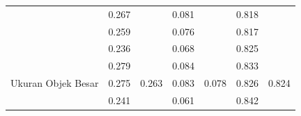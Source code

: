\begin{table}[]
\begin{tabular}{|l|cc|cc|cc|}
                                                      & \multicolumn{1}{c|}{\cellcolor[HTML]{FFFFFF}0.267} & \cellcolor[HTML]{FFFFFF}                         & \multicolumn{1}{c|}{\cellcolor[HTML]{FFFFFF}0.081} & \cellcolor[HTML]{FFFFFF}                           & \multicolumn{1}{c|}{\cellcolor[HTML]{FFFFFF}0.818} & \cellcolor[HTML]{FFFFFF}                        \\ \cline{2-2} \cline{4-4} \cline{6-6}
                                                      & \multicolumn{1}{c|}{\cellcolor[HTML]{FFFFFF}0.259} & \cellcolor[HTML]{FFFFFF}                         & \multicolumn{1}{c|}{\cellcolor[HTML]{FFFFFF}0.076} & \cellcolor[HTML]{FFFFFF}                           & \multicolumn{1}{c|}{\cellcolor[HTML]{FFFFFF}0.817} & \cellcolor[HTML]{FFFFFF}                        \\ \cline{2-2} \cline{4-4} \cline{6-6}
                                                      & \multicolumn{1}{c|}{\cellcolor[HTML]{FFFFFF}0.236} & \cellcolor[HTML]{FFFFFF}                         & \multicolumn{1}{c|}{\cellcolor[HTML]{FFFFFF}0.068} & \cellcolor[HTML]{FFFFFF}                           & \multicolumn{1}{c|}{\cellcolor[HTML]{FFFFFF}0.825} & \cellcolor[HTML]{FFFFFF}                        \\ \cline{2-2} \cline{4-4} \cline{6-6}
                                                      & \multicolumn{1}{c|}{\cellcolor[HTML]{FFFFFF}0.279} & \cellcolor[HTML]{FFFFFF}                         & \multicolumn{1}{c|}{\cellcolor[HTML]{FFFFFF}0.084} & \cellcolor[HTML]{FFFFFF}                           & \multicolumn{1}{c|}{\cellcolor[HTML]{FFFFFF}0.833} & \cellcolor[HTML]{FFFFFF}                        \\ \cline{2-2} \cline{4-4} \cline{6-6}
  \multirow{-5}{*}{Ukuran Objek Besar}             & \multicolumn{1}{c|}{\cellcolor[HTML]{FFFFFF}0.275} & \multirow{-5}{*}{\cellcolor[HTML]{FFFFFF}0.263} & \multicolumn{1}{c|}{\cellcolor[HTML]{FFFFFF}0.083} & \multirow{-5}{*}{\cellcolor[HTML]{FFFFFF}0.078} & \multicolumn{1}{c|}{\cellcolor[HTML]{FFFFFF}0.826} & \multirow{-5}{*}{\cellcolor[HTML]{FFFFFF}0.824} \\ \hline
                                                      & \multicolumn{1}{c|}{\cellcolor[HTML]{FFFFFF}0.241} & \cellcolor[HTML]{FFFFFF}                         & \multicolumn{1}{c|}{\cellcolor[HTML]{FFFFFF}0.061} & \cellcolor[HTML]{FFFFFF}                           & \multicolumn{1}{c|}{\cellcolor[HTML]{FFFFFF}0.842} & \cellcolor[HTML]{FFFFFF}                        \\ \cline{2-2} \cline{4-4} \cline{6-6}

\end{tabular}
\end{table}
